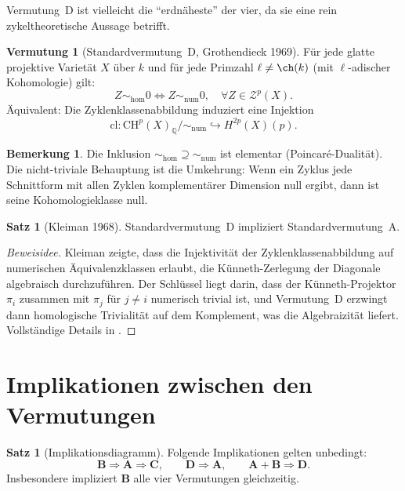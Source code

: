 \documentclass[12pt,a4paper]{amsart}
\theoremstyle{definition}
\newtheorem{satz}[theorem]{Satz}
\newtheorem{vermutung}[theorem]{Vermutung}
\newtheorem{bemerkung}[theorem]{Bemerkung}
\newcommand{\Q}{\mathbb{Q}}
\newcommand{\CH}{\mathrm{CH}}
\newcommand{\cl}{\mathrm{cl}}
\begin{document}
Vermutung~D ist vielleicht die ``erdnäheste'' der vier, da sie eine rein
zykeltheoretische Aussage betrifft.

\begin{vermutung}[Standardvermutung~D, Grothendieck 1969]\label{verm:D}
Für jede glatte projektive Varietät $X$ über $k$ und für jede Primzahl
$\ell \neq \ch(k)$ (mit $\ell$-adischer Kohomologie) gilt:
\[
  Z \sim_{\mathrm{hom}} 0 \iff Z \sim_{\mathrm{num}} 0,
  \quad \forall Z \in \mathcal{Z}^p(X).
\]
Äquivalent: Die Zyklenklassenabbildung induziert eine Injektion
\[
  \cl: \CH^p(X)_\Q / {\sim_{\mathrm{num}}} \hookrightarrow H^{2p}(X)(p).
\]
\end{vermutung}

\begin{bemerkung}
Die Inklusion ${\sim_{\mathrm{hom}}} \supseteq {\sim_{\mathrm{num}}}$
ist elementar (Poincaré-Dualität).  Die nicht-triviale Behauptung ist die
Umkehrung: Wenn ein Zyklus jede Schnittform mit allen Zyklen komplementärer
Dimension null ergibt, dann ist seine Kohomologieklasse null.
\end{bemerkung}

\begin{satz}[Kleiman 1968]\label{satz:D_impliziert_A}
Standardvermutung~D impliziert Standardvermutung~A.
\end{satz}

\begin{proof}[Beweisidee]
Kleiman zeigte, dass die Injektivität der Zyklenklassenabbildung auf
numerischen Äquivalenzklassen erlaubt, die Künneth-Zerlegung der Diagonale
algebraisch durchzuführen.  Der Schlüssel liegt darin, dass der Künneth-Projektor
$\pi_i$ zusammen mit $\pi_j$ für $j \neq i$ numerisch trivial ist, und
Vermutung~D erzwingt dann homologische Trivialität auf dem Komplement,
was die Algebraizität liefert.  Vollständige Details in \cite{kleiman1968}.
\end{proof}

\section{Implikationen zwischen den Vermutungen}\label{sec:implikationen}

\begin{satz}[Implikationsdiagramm]\label{satz:implikationen}
Folgende Implikationen gelten unbedingt:
\[
  \mathbf{B} \Rightarrow \mathbf{A} \Rightarrow \mathbf{C},
  \qquad
  \mathbf{D} \Rightarrow \mathbf{A},
  \qquad
  \mathbf{A} + \mathbf{B} \Rightarrow \mathbf{D}.
\]
Insbesondere impliziert $\mathbf{B}$ alle vier Vermutungen gleichzeitig.
\end{satz}
\end{document}
